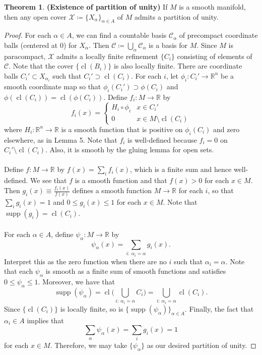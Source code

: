 \documentclass[10pt,letterpaper,cm]{nupset}
\theoremstyle{definition}
\newtheorem{theorem}{Theorem}
\newcommand{\R}{\mathbb R}
\newcommand{\1}{\mathbf{1}}
\newcommand{\0}{\vec 0}
\DeclareMathOperator{\supp}{supp}
\DeclareMathOperator{\cl}{cl}
\begin{document}
\begin{theorem}{\textbf{(Existence of partition of unity)}}
If $M$ is a smooth manifold, then any open cover $\mathcal{X}\coloneqq \{X_{\alpha}\}_{\alpha \in A}$ of $M$ admits a partition of unity. 
\end{theorem}
\begin{proof}
For each $\alpha \in A$, we can find a countable basis $\mathcal{C}_{\alpha}$ of precompact  coordinate balls (centered at $0$) for $X_{\alpha}$. Then $\mathcal{C}\coloneqq \bigcup_{\alpha} \mathcal{C}_{\alpha}$ is a basis for $M$. Since $M$ is paracompact, $\mathcal{X}$ admits a locally finite refinement $\{C_i\}$ consisting of elements of $\mathcal{C}$. Note that the cover $\{\cl(B_i)\}$ is also locally finite. There are coordinate balls $C_i' \subset X_{\alpha_i}$ such that $ C_i'\supset \cl(C_i)$. For each $i$, let $\phi_i : C_i' \to \R^n$ be a smooth coordinate map so that $\phi_i(C_i') \supset \phi(C_i)$ and $\phi(\cl(C_i)) = \cl(\phi(C_i))$. Define $f_i: M \to \R$ by $$f_i(x) = \begin{cases}  H_i \circ \phi_i &   x\in C_i' \\ 0 & x \in M \setminus \cl(C_i)    \end{cases}      $$ where $H_i: \R^n \to \R$ is a smooth function that is positive on $\phi_i(C_i)$ and zero elsewhere, as in Lemma 5. Note that $f_i$ is well-defined because $f_i=0$ on $C_i' \setminus \cl(C_i)$. Also, it is smooth by the gluing lemma for open sets. 
\\ \\
Define $f: M \to \R$ by $f(x) = \sum_{i}f_i(x)$, which is a finite sum and hence well-defined. We see that $f$ is a smooth function and that $f(x) >0$ for each $x\in M$. Then $g_i(x) \equiv \frac{f_i(x)}{f(x)}$ defines a smooth function $M \to \R$ for each $i$, so that $\sum_i g_i(x) = 1$ and $0\leq g_i(x) \leq 1$ for each $x\in M$. Note that $\supp(g_i) = \cl(C_i)$. 
\\ \\
For each $\alpha \in A$, define $\psi_{\alpha} : M \to \R$ by $$\psi_{\alpha}(x) = \sum_{i:\ \alpha_i=\alpha}g_i(x)     .$$ Interpret this as the zero function when there are no $i$ such that $\alpha_i = \alpha$.  Note that each $\psi_{\alpha}$ is smooth as a finite sum of smooth functions and satisfies $0\leq  \psi_{\alpha} \leq 1$. Moreover, we have that $$\supp(\psi_{\alpha}) = \cl \big(\bigcup_{i:\ \alpha_i=\alpha} C_i \big )= \bigcup_{i:\ \alpha_i=\alpha} \cl(C_i). $$ Since $\{\cl(C_i)\}$ is locally finite, so is $\{\supp(\psi_{\alpha})\}_{\alpha \in A}$. Finally, the fact that $\alpha_i \in A$ implies that $$\sum_{\alpha} \psi_{\alpha}(x) = \sum_i g_i(x) =1$$ for each $x\in M$. Therefore, we may take $\{\psi_{\alpha}\}$ as our desired partition of unity. 
\end{proof}
\end{document}
